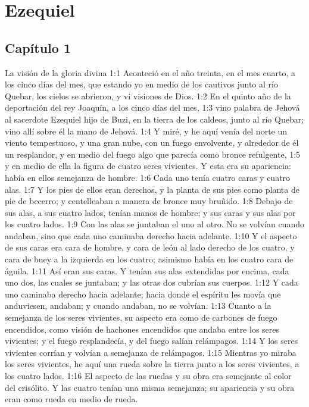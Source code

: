 \chapter{Ezequiel}



\section*{Capítulo 1}
La visión de la gloria divina   
1:1 Aconteció en el año treinta, en el mes cuarto, a los cinco días del mes, que estando yo en medio de los cautivos junto al río Quebar, los cielos se abrieron, y vi visiones de Dios.   
1:2 En el quinto año de la deportación del rey Joaquín, a los cinco días del mes,   
1:3 vino palabra de Jehová al sacerdote Ezequiel hijo de Buzi, en la tierra de los caldeos, junto al río Quebar; vino allí sobre él la mano de Jehová.   
1:4 Y miré, y he aquí venía del norte un viento tempestuoso, y una gran nube, con un fuego envolvente, y alrededor de él un resplandor, y en medio del fuego algo que parecía como bronce refulgente,   
1:5 y en medio de ella la figura de cuatro seres vivientes. Y esta era su apariencia: había en ellos semejanza de hombre.   
1:6 Cada uno tenía cuatro caras y cuatro alas.   
1:7 Y los pies de ellos eran derechos, y la planta de sus pies como planta de pie de becerro; y centelleaban a manera de bronce muy bruñido.   
1:8 Debajo de sus alas, a sus cuatro lados, tenían manos de hombre; y sus caras y sus alas por los cuatro lados.   
1:9 Con las alas se juntaban el uno al otro. No se volvían cuando andaban, sino que cada uno caminaba derecho hacia adelante.   
1:10 Y el aspecto de sus caras era cara de hombre, y cara de león al lado derecho de los cuatro, y cara de buey a la izquierda en los cuatro; asimismo había en los cuatro cara de águila. 
1:11 Así eran sus caras. Y tenían sus alas extendidas por encima, cada uno dos, las cuales se juntaban; y las otras dos cubrían sus cuerpos.   
1:12 Y cada uno caminaba derecho hacia adelante; hacia donde el espíritu les movía que anduviesen, andaban; y cuando andaban, no se volvían.   
1:13 Cuanto a la semejanza de los seres vivientes, su aspecto era como de carbones de fuego encendidos, como visión de hachones encendidos que andaba entre los seres vivientes; y el fuego resplandecía, y del fuego salían relámpagos.   
1:14 Y los seres vivientes corrían y volvían a semejanza de relámpagos.   
1:15 Mientras yo miraba los seres vivientes, he aquí una rueda sobre la tierra junto a los seres vivientes, a los cuatro lados.   
1:16 El aspecto de las ruedas y su obra era semejante al color del crisólito. Y las cuatro tenían una misma semejanza; su apariencia y su obra eran como rueda en medio de rueda.   
